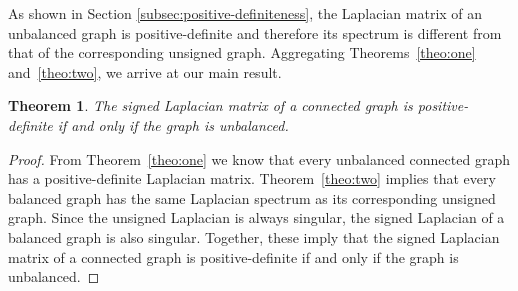 \documentclass[11pt,a4paper]{book}
\newtheorem{theorem}{Theorem}
\begin{document}
As shown in Section \ref{subsec:positive-definiteness}, the Laplacian
matrix of an unbalanced
graph is positive-definite and therefore its spectrum is different
from that of the corresponding unsigned graph. 
Aggregating Theorems~\ref{theo:one} and~\ref{theo:two}, we arrive at our
main result.

\begin{theorem}
  The signed Laplacian matrix of a connected graph is positive-definite if and only
  if the graph is unbalanced.
\end{theorem}
\begin{proof}
  From Theorem~\ref{theo:one} we know that every unbalanced connected
  graph has a positive-definite Laplacian matrix.
  Theorem~\ref{theo:two} implies that every balanced graph has the same
  Laplacian spectrum as its corresponding unsigned graph.  Since the
  unsigned Laplacian is always singular, the signed Laplacian of a
  balanced graph is also singular.  
  Together, these imply that the signed Laplacian matrix of a connected
  graph is positive-definite if and only if the graph is unbalanced. 
\end{proof}
\end{document}
